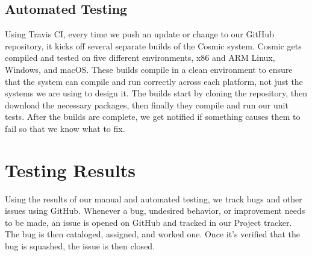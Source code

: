 \documentclass[conference]{IEEEtran}
\begin{document}
\subsection{Automated Testing}
Using Travis CI, every time we push an update or change to our GitHub repository, it kicks off several separate builds of the Cosmic system. Cosmic gets compiled and tested on five different environments, x86 and ARM Linux, Windows, and macOS. These builds compile in a clean environment to ensure that the system can compile and run correctly across each platform, not just the systems we are using to design it. The builds start by cloning the repository, then download the necessary packages, then finally they compile and run our unit tests. After the builds are complete, we get notified if something causes them to fail so that we know what to fix.

\section{Testing Results}
Using the results of our manual and automated testing, we track bugs and other issues using GitHub. Whenever a bug, undesired behavior, or improvement needs to be made, an issue is opened on GitHub and tracked in our Project tracker. The bug is then cataloged, assigned, and worked one. Once it's verified that the bug is squashed, the issue is then closed.
\end{document}
